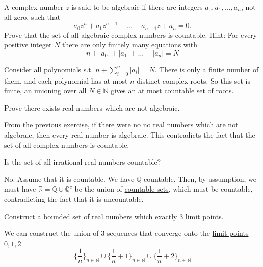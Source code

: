   \begin{exercise}[Rudin 2.2]
    A complex number $z$ is said to be algebraic if there are integers $a_0, a_1, \ldots, a_n$, not all zero, such that
    \begin{equation}
      a_0z^n + a_1z^{n-1} + \ldots + a_{n-1}z + a_n = 0.
    \end{equation}
    Prove that the set of all algebraic complex numbers is countable. Hint: For every positive integer $N$ there are only finitely many equations with 
    \begin{equation}
      n + |a_0| + |a_1| + \ldots + |a_n| = N
    \end{equation}
  \end{exercise}
  \begin{solution}
    Consider all polynomials s.t. $n + \sum_{i=0}^n |a_i| = N$. There is only a finite number of them, and each polynomial has at most $n$ distinct complex roots. So this set is finite, an unioning over all $N \in \mathbb{N}$ gives an at most \hyperref[st-def:countable]{countable set} of roots. 
  \end{solution}

  \begin{exercise}[Rudin 2.3]
    Prove there exists real numbers which are not algebraic. 
  \end{exercise}
  \begin{solution}
    From the previous exercise, if there were no no real numbers which are not algebraic, then every real number is algebraic. This contradicts the fact that the set of all complex numbers is countable. 
  \end{solution}

  \begin{exercise}[Rudin 2.4]
    Is the set of all irrational real numbers countable? 
  \end{exercise}
  \begin{solution}
    No. Assume that it is countable. We have $\mathbb{Q}$ countable. Then, by assumption, we must have $\mathbb{R} = \mathbb{Q} \cup \mathbb{Q}^c$ be the union of \hyperref[st-def:countable]{countable sets}, which must be countable, contradicting the fact that it is uncountable. 
  \end{solution}

  \begin{exercise}[Rudin 2.5]
    Construct a \hyperref[pst-def:bounded-set]{bounded set} of real numbers which exactly 3 \hyperref[pst-def:limit-point]{limit points}. 
  \end{exercise}
  \begin{solution}
    We can construct the union of 3 sequences that converge onto the \hyperref[pst-def:limit-point]{limit points} $0, 1, 2$. 
    \begin{equation}
      \big\{ \frac{1}{n} \big\}_{n \in \mathbb{N}} \cup \big\{ \frac{1}{n} + 1\}_{n \in \mathbb{N}} \cup \big\{ \frac{1}{n} + 2 \big\}_{n \in \mathbb{N}}
    \end{equation}
  \end{solution}

